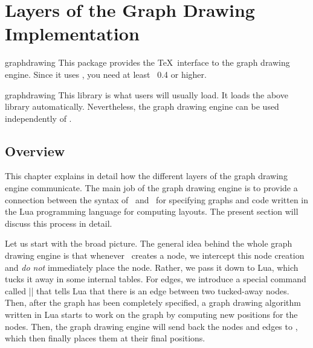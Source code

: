 %
%
%


\section{Layers of the Graph Drawing Implementation}

{}

\label{section-base-graphdrawing}
\label{section-gd-internals}

\begin{pgflibrary}{graphdrawing}
  This package provides the \TeX\ interface to the graph drawing
  engine. Since it uses \LuaTeX, you need at least \LuaTeX\ 0.4 or 
  higher.
\end{pgflibrary}

\begin{tikzlibrary}{graphdrawing}
  This library is what users will usually load. It loads the above
  library automatically. Nevertheless, the graph drawing engine can be
  used independently of \tikzname.
\end{tikzlibrary}



\subsection{Overview}

This chapter explains in detail how the different layers of the graph
drawing engine communicate. The main job of the graph drawing engine
is to provide a connection between the syntax of \tikzname\
and \pgfname\ for specifying graphs and code written in the Lua
programming language for computing layouts. The present section will
discuss this process in detail.

Let us start with the broad picture. The general idea behind the whole
graph drawing engine is that whenever \pgfname\ creates a node, we
intercept this node creation and \emph{do not} immediately place the
node. Rather, we pass it down to Lua, which tucks it away in
some internal tables. For edges, we introduce a special command called
|\pgfgdedge| that tells Lua that there is an edge between two
tucked-away nodes. Then, after the graph has been completely
specified, a graph drawing algorithm written in Lua starts to work on
the graph by computing new positions for the nodes. Then, the graph
drawing engine will send back the nodes and edges to \pgfname, which
then finally places them at their final positions.

